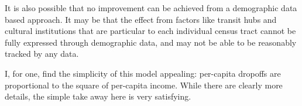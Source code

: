 \documentclass[11pt]{article}
\begin{document}
It is also possible that no improvement can be achieved from a demographic data based approach.
It may be that the effect from factors like transit hubs and cultural institutions that are particular to each individual census tract cannot be fully expressed through demographic data, and may not be able to be reasonably tracked by any data.

I, for one, find the simplicity of this model appealing: per-capita dropoffs are proportional to the square of per-capita income.
While there are clearly more details, the simple take away here is very satisfying.













\newpage


\listoftodos
\end{document}
